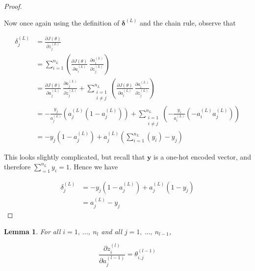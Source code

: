 \documentclass{article}[11pt]
\newtheorem{lemma}{Lemma}
\begin{document}
\begin{proof}
\begin{itemize}
            \end{itemize}
            
            Now once again using the definition of $\boldsymbol{\delta}^{(L)}$ and the chain rule, observe that
            
            $$ \begin{aligned}
            \delta^{(L)}_j &= \frac{\partial J(\theta)}{\partial z^{(L)}_j} \\
            &= \sum_{i=1}^{n_L} \left( \frac{\partial J(\theta)}{\partial a^{(L)}_i} \ \frac{\partial a^{(L)}_i}{\partial z^{(L)}_j} \right) \\
            &= \frac{\partial J(\theta)}{\partial a^{(L)}_j} \ \frac{\partial a^{(L)}_j}{\partial z^{(L)}_j} + \sum_{\substack{i=1 \\ i \neq j}}^{n_L} \left( \frac{\partial J(\theta)}{\partial a^{(L)}_i} \ \frac{\partial a^{(L)}_i}{\partial z^{(L)}_j} \right) \\
            &= - \frac{y_j}{a^{(L)}_j} \left( a^{(L)}_j (1 - a^{(L)}_j) \right) + \sum_{\substack{i=1 \\ i \neq j}}^{n_L} \left( - \frac{y_i}{a^{(L)}_i} \left(- a^{(L)}_i a^{(L)}_j \right) \right) \\
            &= - y_j (1 - a^{(L)}_j) + a^{(L)}_j \left( \sum_{i=1}^{n_L} \left( y_i \right) - y_j \right)
            \end{aligned} $$
            
            This looks slightly complicated, but recall that $\mathbf{y}$ is a one-hot encoded vector, and therefore $\sum_{=1}^{n_L} y_i = 1$. Hence we have
            
            $$ \begin{aligned}
            \delta^{(L)}_j &= - y_j (1 - a^{(L)}_j) + a^{(L)}_j (1 - y_j) \\
            &= a^{(L)}_j - y_j
            \end{aligned} $$
            
        \end{proof}
    
        
        
        \begin{lemma}
            
            For all $i = 1, \ \ldots, \ n_l$ and all $j = 1, \ \ldots, \ n_{l-1}$,
            
            $$
            \frac{\partial z^{(l)}_i}{\partial a^{(l-1)}_j} = \theta^{(l-1)}_{i,j}
            $$
            
        \end{lemma}
        
\end{document}
